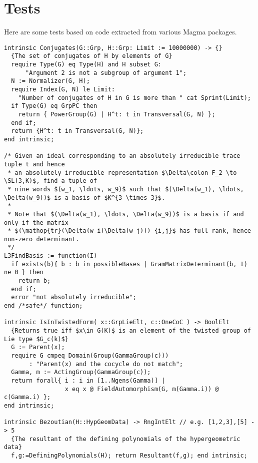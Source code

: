 \documentclass{article}
\begin{document}
\inputminted{python}{magma.py}


\section{Tests}

\def\SL{\mathop{\mathrm{SL}}}

Here are some tests based on code extracted from various Magma packages.

\begin{verbatim}
intrinsic Conjugates(G::Grp, H::Grp: Limit := 10000000) -> {}
  {The set of conjugates of H by elements of G}
  require Type(G) eq Type(H) and H subset G:
	  "Argument 2 is not a subgroup of argument 1";
  N := Normalizer(G, H);
  require Index(G, N) le Limit:
    "Number of conjugates of H in G is more than " cat Sprint(Limit);
  if Type(G) eq GrpPC then
    return { PowerGroup(G) | H^t: t in Transversal(G, N) };
  end if;
  return {H^t: t in Transversal(G, N)};
end intrinsic;

/* Given an ideal corresponding to an absolutely irreducible trace tuple t and hence
 * an absolutely irreducible representation $\Delta\colon F_2 \to \SL(3,K)$, find a tuple of
 * nine words $(w_1, \ldots, w_9)$ such that $(\Delta(w_1), \ldots, \Delta(w_9))$ is a basis of $K^{3 \times 3}$.
 *
 * Note that $(\Delta(w_1), \ldots, \Delta(w_9))$ is a basis if and only if the matrix
 * $(\mathop{tr}(\Delta(w_i)\Delta(w_j)))_{i,j}$ has full rank, hence non-zero determinant.
 */
L3FindBasis := function(I)
  if exists(b){ b : b in possibleBases | GramMatrixDeterminant(b, I) ne 0 } then
    return b;
  end if;
  error "not absolutely irreducible";
end /*safe*/ function;

intrinsic IsInTwistedForm( x::GrpLieElt, c::OneCoC ) -> BoolElt
  {Returns true iff $x\in G(K)$ is an element of the twisted group of Lie type $G_c(k)$}
  G := Parent(x);
  require G cmpeq Domain(Group(GammaGroup(c)))
       : "Parent(x) and the cocycle do not match";
  Gamma, m := ActingGroup(GammaGroup(c));
  return forall{ i : i in [1..Ngens(Gamma)] |
                 x eq x @ FieldAutomorphism(G, m(Gamma.i)) @ c(Gamma.i) };
end intrinsic;

intrinsic Bezoutian(H::HypGeomData) -> RngIntElt // e.g. [1,2,3],[5] -> 5
  {The resultant of the defining polynomials of the hypergeometric data}
  f,g:=DefiningPolynomials(H); return Resultant(f,g); end intrinsic;
\end{verbatim}
\end{document}
